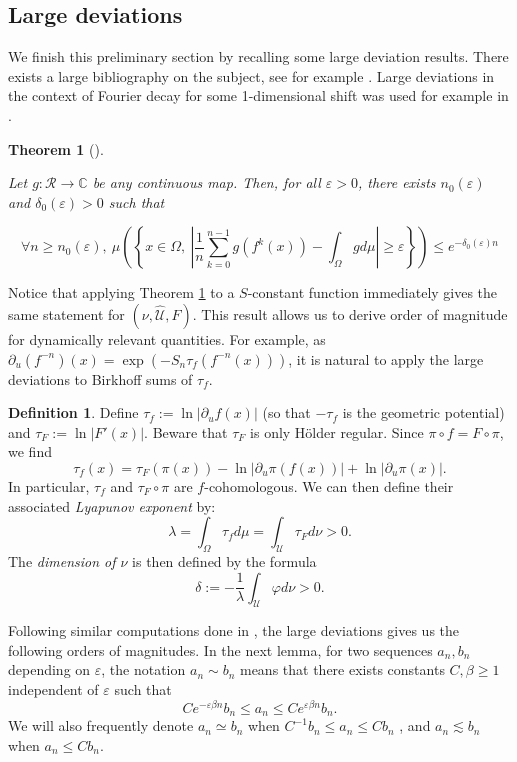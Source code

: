 \documentclass[a4paper]{article}
\newtheorem{theorem}{Theorem}[section]
\theoremstyle{definition}
\newtheorem{definition}{Definition}[section]
\begin{document}
\subsection{Large deviations }

We finish this preliminary section by recalling some large deviation results. There exists a large bibliography on the subject, see for example \cite{Ki90}. Large deviations in the context of Fourier decay for some 1-dimensional shift was used for example in \cite{JS16, SS20,Le24,LPS25}. 

\begin{theorem}[\cite{Yo90,LQZ03}]\label{th:largedev}

Let $g : \mathcal{R} \rightarrow \mathbb{C}$ be any continuous map. Then, for all $\varepsilon>0$, there exists $n_0(\varepsilon)$ and $\delta_0(\varepsilon) > 0$ such that

$$ \forall n \geq n_0(\varepsilon), \ \mu \left( \left\{ x \in \Omega , \ \left| \frac{1}{n} \sum_{k=0}^{n-1} g(f^k(x)) - \int_{\Omega} g d\mu \right| \geq \varepsilon \right\} \right) \leq e^{-\delta_0(\varepsilon) n} $$

\end{theorem}

Notice that applying Theorem \ref{th:largedev} to a $S$-constant function immediately gives the same statement for $(\nu,\widehat{\mathcal{U}},F)$. This result allows us to derive order of magnitude for dynamically relevant quantities. For example, as $\partial_u(f^{-n})(x) = \exp( - S_n \tau_f(f^{-n}(x)) )$, it is natural to apply the large deviations to Birkhoff sums of $\tau_f$.

\begin{definition}\label{def:lyap}
Define $\tau_f := \ln |\partial_u f (x)| $  (so that $-\tau_f$ is the geometric potential) and $\tau_F := \ln |F'(x)|$. Beware that $\tau_F$ is only Hölder regular. Since $\pi \circ f = F \circ \pi$, we find
$$ \tau_f(x) = \tau_F(\pi(x)) - \ln |\partial_u \pi(f(x))| + \ln |\partial_u \pi(x)| .$$
In particular, $ \tau_f $ and $\tau_F \circ \pi$ are $f$-cohomologous. We can then define their associated \emph{Lyapunov exponent} by:
$$ \lambda = \int_{\Omega} \tau_f d\mu = \int_{\mathcal{U}} \tau_F d\nu > 0.$$
The \emph{dimension of $\nu$} is then defined by the formula
$$ \delta := -\frac{1}{\lambda} \int_\mathcal{U} \varphi d\nu > 0. $$
\end{definition}

Following similar computations done in \cite{SS20,Le23a,Le24, LPS25}, the large deviations gives us the following orders of magnitudes. In the next lemma, for two sequences $a_n,b_n$ depending on $\varepsilon$, the notation $a_n \sim b_n$ means that there exists constants $C,\beta \geq 1$ independent of $\varepsilon$ such that $$ C e^{- \varepsilon \beta n} b_n \leq a_n \leq C e^{\varepsilon \beta n} b_n .$$
We will also frequently denote $a_n \simeq b_n$ when $ C^{-1} b_n \leq a_n \leq C b_n $ , and $a_n \lesssim b_n$ when $a_n \leq C b_n$.
\end{document}
